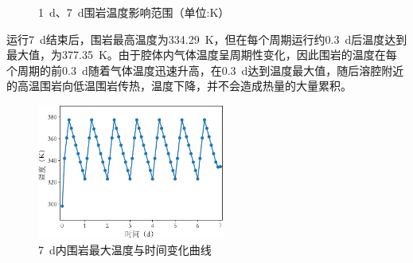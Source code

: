 \begin{figure}[ht!]
{    }
    \caption{\SI{1}{d}、\SI{7}{d}围岩温度影响范围（单位:K）}
    \label{fig：temperaturefanwei}
\end{figure}

运行\SI{7}{d}结束后，围岩最高温度为\SI{334.29}{K}，但在每个周期运行约\SI{0.3}{d}后温度达到最大值，为\SI{377.35}{K}。由于腔体内气体温度呈周期性变化，因此围岩的温度在每个周期的前\SI{0.3}{d}随着气体温度迅速升高，在\SI{0.3}{d}达到温度最大值，随后溶腔附近的高温围岩向低温围岩传热，温度下降，并不会造成热量的大量累积。

\begin{figure}[ht!]
    \centering
    \includegraphics[width=0.55\textwidth]{img/chap5/7d最大温度.pdf}
    \caption{\SI{7}{d}内围岩最大温度与时间变化曲线}
    \label{fig:7d_temperature_t}
\end{figure}


